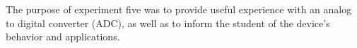 The purpose of experiment five was to provide useful experience with an analog
to digital converter (ADC), as well as to inform the student of the device's
behavior and applications.
